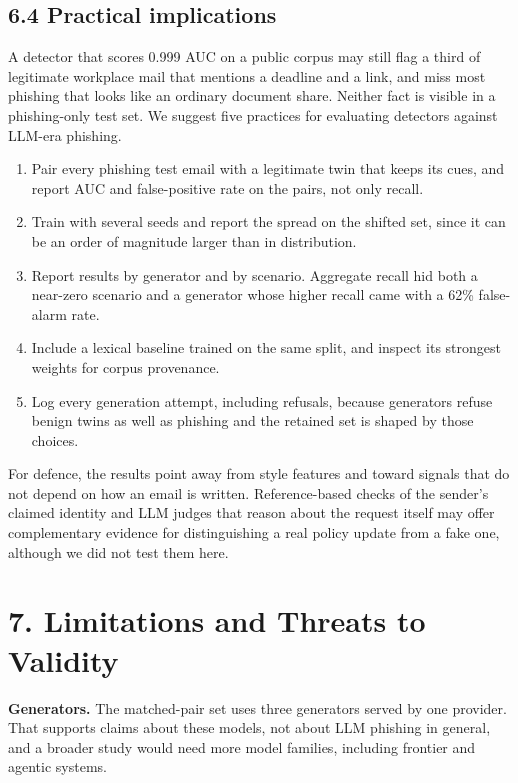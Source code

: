 \documentclass[11pt,letterpaper]{article}
\begin{document}
\subsection{6.4 Practical implications}

A detector that scores 0.999 AUC on a public corpus may still flag a third of legitimate workplace mail that mentions a deadline and a link, and miss most phishing that looks like an ordinary document share. Neither fact is visible in a phishing-only test set. We suggest five practices for evaluating detectors against LLM-era phishing.

\begin{enumerate}
\item Pair every phishing test email with a legitimate twin that keeps its cues, and report AUC and false-positive rate on the pairs, not only recall.
\item Train with several seeds and report the spread on the shifted set, since it can be an order of magnitude larger than in distribution.
\item Report results by generator and by scenario. Aggregate recall hid both a near-zero scenario and a generator whose higher recall came with a 62\% false-alarm rate.
\item Include a lexical baseline trained on the same split, and inspect its strongest weights for corpus provenance.
\item Log every generation attempt, including refusals, because generators refuse benign twins as well as phishing and the retained set is shaped by those choices.
\end{enumerate}

For defence, the results point away from style features and toward signals that do not depend on how an email is written. Reference-based checks of the sender's claimed identity \cite{liu2025} and LLM judges that reason about the request itself \cite{koide2025} may offer complementary evidence for distinguishing a real policy update from a fake one, although we did not test them here.

\section{7. Limitations and Threats to Validity}

\textbf{Generators.} The matched-pair set uses three generators served by one provider. That supports claims about these models, not about LLM phishing in general, and a broader study would need more model families, including frontier and agentic systems.
\end{document}
